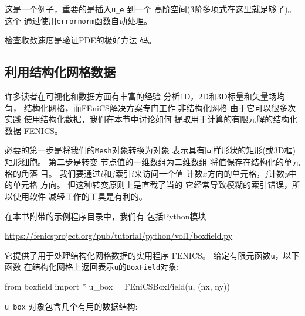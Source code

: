 \noindent
这是一个例子，重要的是插入\verb!u_e! 到一个
高阶空间(3阶多项式在这里就足够了)。 这个
通过使用\texttt{errornorm}函数自动处理。

检查收敛速度是验证PDE的极好方法
码。

\subsection{利用结构化网格数据}
\label{ftut:structviz}

许多读者在可视化和数据方面有丰富的经验
分析1D，2D和3D标量和矢量场均匀，
结构化网格，而FEniCS解决方案专门工作
非结构化网格 由于它可以很多次实践
使用结构化数据，我们在本节中讨论如何
提取用于计算的有限元解的结构化数据
FENICS。


必要的第一步是将我们的\texttt{Mesh}对象转换为对象
表示具有同样形状的矩形(或3D框)
矩形细胞。 第二步是转变
节点值的一维数组为二维数组
将值保存在结构化的单元格的角落
目。 我们要通过$i$和$j$索引$i$来访问一个值
计数$x$方向的单元格，$j$计数$y$中的单元格
方向。 但这种转变原则上是直截了当的
它经常导致模糊的索引错误，所以使用软件
减轻工作的工具是有利的。

在本书附带的示例程序目录中，我们有
包括Python模块
\begin{center}
\url{https://fenicsproject.org/pub/tutorial/python/vol1/boxfield.py}
\end{center}
它提供了用于处理结构化网格数据的实用程序
FENICS。 给定有限元函数\texttt{u}，以下函数
在结构化网格上返回表示\texttt{u}的\texttt{BoxField}对象:

\begin{python}
from boxfield import *
u_box = FEniCSBoxField(u, (nx, ny))
\end{python}

\verb!u_box! 对象包含几个有用的数据结构:


